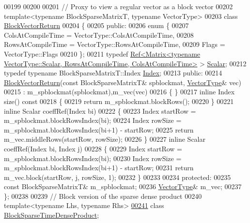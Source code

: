 \begin{DoxyCode}
00199 
00200 
00201 \textcolor{comment}{// Proxy to view a regular vector as a block vector}
00202 \textcolor{keyword}{template}<\textcolor{keyword}{typename} BlockSparseMatrixT, \textcolor{keyword}{typename} VectorType>
00203 \textcolor{keyword}{class }\hyperlink{class_eigen_1_1_block_vector_return}{BlockVectorReturn}
00204 \{
00205   \textcolor{keyword}{public}:
00206     \textcolor{keyword}{enum} \{
00207       ColsAtCompileTime = VectorType::ColsAtCompileTime,
00208       RowsAtCompileTime = VectorType::RowsAtCompileTime,
00209       Flags = VectorType::Flags
00210     \};
00211     \textcolor{keyword}{typedef} 
      \hyperlink{group___core___module_class_eigen_1_1_ref}{Ref<Matrix<typename VectorType::Scalar, RowsAtCompileTime, ColsAtCompileTime>}
       > \hyperlink{group___core___module_class_eigen_1_1_ref}{Scalar};
00212     \textcolor{keyword}{typedef} \textcolor{keyword}{typename} BlockSparseMatrixT::Index \hyperlink{namespace_eigen_a62e77e0933482dafde8fe197d9a2cfde}{Index};
00213   \textcolor{keyword}{public}:
00214     \hyperlink{class_eigen_1_1_block_vector_return}{BlockVectorReturn}(\textcolor{keyword}{const} BlockSparseMatrixT& spblockmat, 
      \hyperlink{struct_vector_type}{VectorType}& vec)
00215     : m\_spblockmat(spblockmat),m\_vec(vec)
00216     \{ \}
00217     \textcolor{keyword}{inline} Index size()\textcolor{keyword}{ const}
00218 \textcolor{keyword}{    }\{
00219       \textcolor{keywordflow}{return} m\_spblockmat.blockRows();
00220     \}
00221     \textcolor{keyword}{inline} Scalar coeffRef(Index bi)
00222     \{
00223       Index startRow = m\_spblockmat.blockRowsIndex(bi);
00224       Index rowSize = m\_spblockmat.blockRowsIndex(bi+1) - startRow;
00225       \textcolor{keywordflow}{return} m\_vec.middleRows(startRow, rowSize);
00226     \}
00227     \textcolor{keyword}{inline} Scalar coeffRef(Index bi, Index j)
00228     \{
00229       Index startRow = m\_spblockmat.blockRowsIndex(bi);
00230       Index rowSize = m\_spblockmat.blockRowsIndex(bi+1) - startRow;
00231       \textcolor{keywordflow}{return} m\_vec.block(startRow, j, rowSize, 1);
00232     \}
00233 
00234   \textcolor{keyword}{protected}:
00235     \textcolor{keyword}{const} BlockSparseMatrixT& m\_spblockmat;
00236     \hyperlink{struct_vector_type}{VectorType}& m\_vec;
00237 \};
00238 
00239 \textcolor{comment}{// Block version of the sparse dense product}
00240 \textcolor{keyword}{template}<\textcolor{keyword}{typename} Lhs, \textcolor{keyword}{typename} Rhs>
\hyperlink{class_eigen_1_1_block_sparse_time_dense_product}{00241} \textcolor{keyword}{class }\hyperlink{class_eigen_1_1_block_sparse_time_dense_product}{BlockSparseTimeDenseProduct};

\end{DoxyCode}
